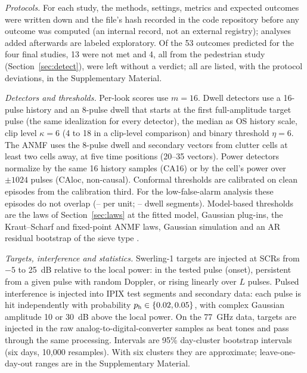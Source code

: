 \documentclass[journal]{IEEEtran}
\begin{document}
\emph{Protocols.} For each study, the methods, settings, metrics and expected outcomes were written down and the file's hash recorded in the code repository before any outcome was computed (an internal record, not an external registry); analyses added afterwards are labeled exploratory. Of the 53 outcomes predicted for the four final studies, 13 were not met and 4, all from the pedestrian study (Section~\ref{sec:detect}), were left without a verdict; all are listed, with the protocol deviations, in the Supplementary Material.

\emph{Detectors and thresholds.} Per-look scores use $m=16$. Dwell detectors use a 16-pulse history and an 8-pulse dwell that starts at the first full-amplitude target pulse (the same idealization for every detector), the median as OS history scale, clip level $\kappa=6$ (4 to 18 in a clip-level comparison) and binary threshold $\eta=6$. The ANMF uses the 8-pulse dwell and secondary vectors from clutter cells at least two cells away, at five time positions (20--35 vectors). Power detectors normalize by the same 16 history samples (CA16) or by the cell's power over $\pm1024$ pulses (CAloc, non-causal). Conformal thresholds are calibrated on clean episodes from the calibration third. For the low-false-alarm analysis these episodes do not overlap (\LowCalMin--\LowCalMax{} per unit; \DwellCalMin--\DwellCalMax{} dwell segments). Model-based thresholds are the laws of Section~\ref{sec:laws} at the fitted model, Gaussian plug-ins, the Kraut--Scharf and fixed-point ANMF laws, Gaussian simulation and an AR residual bootstrap of the sieve type \cite{qu2024sieve}.

\emph{Targets, interference and statistics.} Swerling-1 targets are injected at SCRs from $-5$ to 25~dB relative to the local power: in the tested pulse (onset), persistent from a given pulse with random Doppler, or rising linearly over $L$ pulses. Pulsed interference is injected into IPIX test segments and secondary data: each pulse is hit independently with probability $p_{\rm h}\in\{0.02,0.05\}$, with complex Gaussian amplitude 10 or 30~dB above the local power. On the 77~GHz data, targets are injected in the raw analog-to-digital-converter samples as beat tones and pass through the same processing. Intervals are 95\% day-cluster bootstrap intervals (six days, 10,000 resamples). With six clusters they are approximate; leave-one-day-out ranges are in the Supplementary Material.
\end{document}
